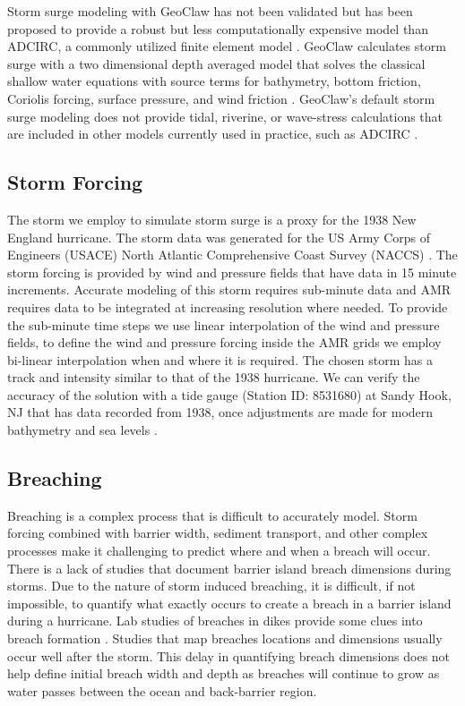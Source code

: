 \documentclass{coastal_paper}
\begin{document}
Storm surge modeling with GeoClaw has not been validated but has been proposed to provide a robust but less computationally expensive model than ADCIRC, a commonly utilized finite element model \citep{Westerink2008, Mandli2014}. GeoClaw calculates storm surge with a two dimensional depth averaged model that solves the classical shallow water equations with source terms for bathymetry, bottom friction, Coriolis forcing, surface pressure, and wind friction \citep{Mandli2014}. GeoClaw's default storm surge modeling does not provide tidal, riverine, or wave-stress calculations that are included in other models currently used in practice, such as ADCIRC \citep{Westerink2008, Mandli2014}.

\subsection{Storm Forcing}
The storm we employ to simulate storm surge is a proxy for the 1938 New England hurricane. The storm data was generated for the US Army Corps of Engineers (USACE) North Atlantic Comprehensive Coast Survey (NACCS) \citep{cialone2015north}. The storm forcing is provided by wind and pressure fields that have data in 15 minute increments. Accurate modeling of this storm requires sub-minute data and AMR requires data to be integrated at increasing resolution where needed. To provide the sub-minute time steps we use linear interpolation of the wind and pressure fields, to define the wind and pressure forcing inside the AMR grids we employ bi-linear interpolation when and where it is required. The chosen storm has a track and intensity similar to that of the 1938 hurricane. We can verify the accuracy of the solution with a tide gauge (Station ID: 8531680) at Sandy Hook, NJ that has data recorded from 1938, once adjustments are made for modern bathymetry and sea levels \citep{coops2007}. 

\subsection{Breaching}
Breaching is a complex process that is difficult to accurately model. Storm forcing combined with barrier width, sediment transport, and other complex processes make it challenging to predict where and when a breach will occur. There is a lack of studies that document barrier island breach dimensions during storms. Due to the nature of storm induced breaching, it is difficult, if not impossible, to quantify what exactly occurs to create a breach in a barrier island during a hurricane. Lab studies of breaches in dikes provide some clues into breach formation \citep{Visser1999}. Studies that map breaches locations and dimensions usually occur well after the storm. This delay in quantifying breach dimensions does not help define initial breach width and depth as breaches will continue to grow as water passes between the ocean and back-barrier region.
\end{document}
